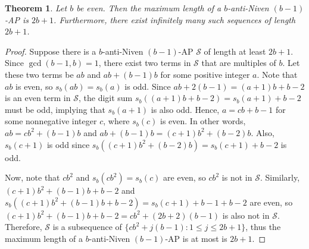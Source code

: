 \documentclass[12pt]{article}
\newtheorem{theorem}{Theorem}[section]
\theoremstyle{definition}
\begin{document}
\begin{theorem}\label{thm:bevenb-1AP}
Let $b$ be even. Then the maximum length of a $b$-anti-Niven $(b-1)$-AP is $2b+1$. Furthermore, there exist infinitely many such sequences of length $2b+1$.
\end{theorem}
\begin{proof}
Suppose there is a $b$-anti-Niven $(b-1)$-AP $\mathcal{S}$ of length at least $2b+1$. Since $\gcd(b-1,b)=1$, there exist two terms in $\mathcal{S}$ that are multiples of $b$. Let these two terms be $ab$ and $ab+(b-1)b$ for some positive integer $a$. Note that $ab$ is even, so $s_b(ab)=s_b(a)$ is odd. Since $ab+2(b-1)=(a+1)b+b-2$ is an even term in $\mathcal{S}$, the digit sum $s_b((a+1)b+b-2)=s_b(a+1)+b-2$ must be odd, implying that $s_b(a+1)$ is also odd. Hence, $a=cb+b-1$ for some nonnegative integer $c$, where $s_b(c)$ is even. In other words, $ab=cb^2+(b-1)b$ and $ab+(b-1)b=(c+1)b^2+(b-2)b$. Also, $s_b(c+1)$ is odd since $s_b((c+1)b^2+(b-2)b)=s_b(c+1)+b-2$ is odd.

Now, note that $cb^2$ and $s_b(cb^2)=s_b(c)$ are even, so $cb^2$ is not in $\mathcal{S}$. Similarly, $(c+1)b^2+(b-1)b+b-2$ and $s_b((c+1)b^2+(b-1)b+b-2)=s_b(c+1)+b-1+b-2$ are even, so $(c+1)b^2+(b-1)b+b-2=cb^2+(2b+2)(b-1)$ is also not in $\mathcal{S}$. Therefore, $\mathcal{S}$ is a subsequence of $\{cb^2+j(b-1):1\leq j\leq2b+1\}$, thus the maximum length of a $b$-anti-Niven $(b-1)$-AP is at most is $2b+1$.


\end{proof}
\end{document}
